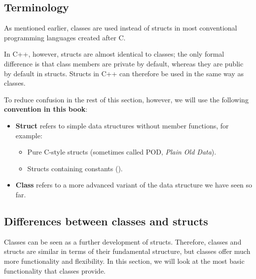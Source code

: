 \subsection{Terminology}
\label{c2:sec:terminology}
As mentioned earlier, classes are used instead of structs in most conventional programming
languages created after C.

In C++, however, structs are almost identical to classes; the only formal difference is that class
members are private by default, whereas they are public by default in structs. Structs in C++ can
therefore be used in the same way as classes.

To reduce confusion in the rest of this section, however, we will use the following
\textbf{convention in this book}:
\begin{itemize}
  \item \textbf{Struct} refers to simple data structures without member functions, for example:
  \begin{itemize}
    \item Pure C-style structs (sometimes called POD, \emph{Plain Old Data}).
    \item Structs containing constants ().
  \end{itemize}
  \item \textbf{Class} refers to a more advanced variant of the data structure we have seen so far.
\end{itemize}

\subsection{Differences between classes and structs}
\label{c2:sec:differences}
Classes can be seen as a further development of structs. Therefore, classes and structs are similar
in terms of their fundamental structure, but classes offer much more functionality and flexibility.
In this section, we will look at the most basic functionality that classes provide.

